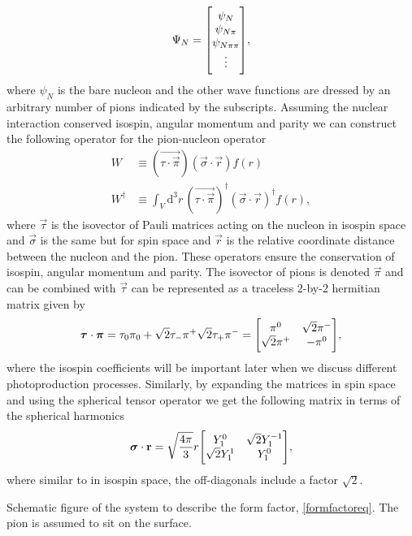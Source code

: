 \begin{equation} \label{superposition}
	\Psi_N = \mqty[\psi_{N} \\
	\psi_{N\pi} \\
	\psi_{N\pi\pi}\\
	\vdots],
\end{equation}
where $\psi_{N}$ is the bare nucleon and the other wave functions are dressed by an arbitrary number of pions indicated by the subscripts. Assuming the nuclear interaction conserved isospin, angular momentum and parity we can construct the following operator for the pion-nucleon operator
\begin{align} \label{W}
	W & \equiv (\vec{\tau\cdot\vec{\pi}})(\vec{\sigma}\cdot\vec{r})f(r) \\
	W^\dagger & \equiv  \int_V \text{d}^3 r \, (\vec{\tau\cdot\vec{\pi}})^\dagger (\vec{\sigma}\cdot\vec{r})^\dagger f(r),
\end{align}
where $\vec{\tau}$ is the isovector of Pauli matrices acting on the nucleon in isospin space and $\vec{\sigma}$ is the same but for spin space and $\vec{r}$ is the relative coordinate distance between the nucleon and the pion. These operators ensure the conservation of isospin, angular momentum and parity. The isovector of pions is denoted $\vec{\pi}$ and can be combined with $\vec{\tau}$ can be represented as a traceless 2-by-2 hermitian matrix given by
\begin{equation} \label{isocoeff}
	\vec{\tau}\cdot \vec{\pi} = \tau_0  \pi_0+ \sqrt{2} \tau_{-}\pi^ +\sqrt{2}\tau_{+} \pi^{-} = \mqty[\pi^0 & \sqrt{2}\pi^- \\
	\sqrt{2}\pi^+ & -\pi^0],
\end{equation}
where the isospin coefficients will be important later when we discuss different photoproduction processes. Similarly, by expanding the matrices in spin space and using the spherical tensor operator we get the following matrix in terms of the spherical harmonics
\begin{equation}\label{spinmatrix}
	\vec{\sigma}\cdot \vec{r} = \sqrt{\frac{4\pi}{3}} r \mqty[Y_{1}^0 & \sqrt{2}Y_1^{-1} \\ \sqrt{2}Y_1^1 & Y_1^0],
\end{equation}
where similar to in isospin space, the off-diagonals include a factor $\sqrt{2}$.  
\begin{marginfigure}
	\centering
	
	\caption{Schematic figure of the system to describe the form factor, \eqref{formfactoreq}. The pion is assumed to sit on the surface.}
	\label{formfactor}
\end{marginfigure}
